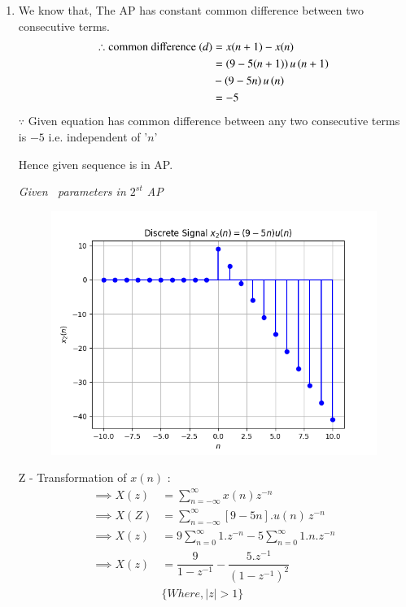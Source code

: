\documentclass[journal,12pt,twocolumn]{IEEEtran}
\theoremstyle{remark}
\begin{document}
\begin{enumerate} [label=(\roman*)]
    \item We know that, The AP has constant common difference between two consecutive terms.
    \begin{align}
        \therefore \text{common difference } (d) &= x(n+1) - x(n) \\
        &= \left(9-5(n+1)\right)u\left(n+1\right) \nonumber\\
        &- \left(9-5n\right)u\left(n\right) \nonumber\\
        &= -5
    \end{align}
   $\because$ Given equation has common difference between any two consecutive terms is $-5$ i.e. independent of '$n$'
   \begin{center}
       Hence given sequence is in AP.
   \end{center}

    \begin{table}[htbp] 
    \centering
    
    \caption{\normalsize\textsl{Given \, parameters in $2^{st}$ AP}}
    \label{given parameters list}
    \end{table}

    \begin{figure}[!h] 
    \centering
    \includegraphics[width=\columnwidth]{figs/signal_x2.png}
    \caption{}
    \label{fig:Graph2}
    \end{figure}

     Z - Transformation of $x(n)$ :
    \begin{align}
         \implies X(z) &= \sum_{n = -\infty}^{\infty} x(n) z^{-n}\\
        \implies  X(Z) &= \sum_{n = -\infty}^{\infty}[9 - 5n].u(n) \, z^{-n} \\
        \implies X(z) &= 9 \sum_{n = 0}^{\infty} 1.z^{-n} - 5 \sum_{n = 0}^{\infty} 1.n.z^{-n}\\
        \implies X(z) &= \dfrac{9}{1-z^{-1}} - \dfrac{5.z^{-1}}{(1-z^{-1})^2}\\
        &\{ Where, |z|>1\} \nonumber
    \end{align}

\end{enumerate}
\end{document}
